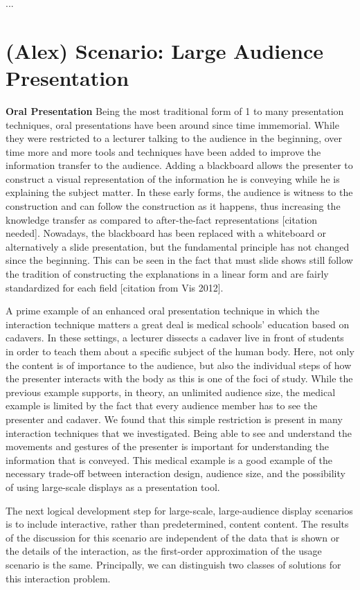 \documentclass[review,journal]{vgtc}         %
\begin{document}
...

\section{(Alex) Scenario: Large Audience Presentation}

\noindent \textbf{Oral Presentation} Being the most traditional form of 1 to many presentation techniques, oral presentations have been around since time immemorial.
While they were restricted to a lecturer talking to the audience in the beginning, over time more and more tools and techniques have been added to improve the information transfer to the audience.
Adding a blackboard allows the presenter to construct a visual representation of the information he is conveying while he is explaining the subject matter.
In these early forms, the audience is witness to the construction and can follow the construction as it happens, thus increasing the knowledge transfer as compared to after-the-fact representations [citation needed].
Nowadays, the blackboard has been replaced with a whiteboard or alternatively a slide presentation, but the fundamental principle has not changed since the beginning.
This can be seen in the fact that must slide shows still follow the tradition of constructing the explanations in a linear form and are fairly standardized for each field [citation from Vis 2012].

A prime example of an enhanced oral presentation technique in which the interaction technique matters a great deal is medical schools' education based on cadavers.
In these settings, a lecturer dissects a cadaver live in front of students in order to teach them about a specific subject of the human body.
Here, not only the content is of importance to the audience, but also the individual steps of how the presenter interacts with the body as this is one of the foci of study.
While the previous example supports, in theory, an unlimited audience size, the medical example is limited by the fact that every audience member has to see the presenter and cadaver.
We found that this simple restriction is present in many interaction techniques that we investigated.
Being able to see and understand the movements and gestures of the presenter is important for understanding the information that is conveyed.
This medical example is a good example of the necessary trade-off between interaction design, audience size, and the possibility of using large-scale displays as a presentation tool.

The next logical development step for large-scale, large-audience display scenarios is to include interactive, rather than predetermined, content content.
The results of the discussion for this scenario are independent of the data that is shown or the details of the interaction, as the first-order approximation of the usage scenario is the same.
Principally, we can distinguish two classes of solutions for this interaction problem.
\end{document}
